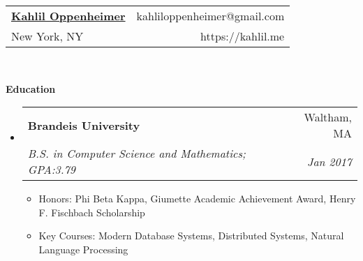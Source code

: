 \documentclass[letterpaper,11pt]{article}
\makeatletter
\newcommand{\resitem}[1]{\item #1 \vspace{-2pt}}
\newcommand{\resheading}[1]{{\large \colorbox{mygrey}{\begin{minipage}{\textwidth}{\textbf{#1 \vphantom{p\^{E}}}}\end{minipage}}}}
\newcommand{\ressubheading}[4]{
\begin{tabular*}{6.5in}{l@{\extracolsep{\fill}}r}
		\textbf{#1} & #2 \\
		\textit{#3} & \textit{#4} \\
\end{tabular*}\vspace{-6pt}}
\makeatother
\begin{document}
\newcommand{\mywebheader}{
	\begin{tabular*}{7in}{l@{\extracolsep{\fill}}r}
		\textbf{\LARGE \href{https://kahlil.me}{Kahlil Oppenheimer}} & {kahliloppenheimer@gmail.com} \\
		New York, NY & https://kahlil.me
	\end{tabular*}
	\\
	\vspace{0.1in}}

\mywebheader

\resheading{Education}
\begin{itemize}
	\item
	      \ressubheading{Brandeis University}{Waltham, MA}{B.S. in Computer Science and Mathematics; GPA:3.79}{Jan 2017}
	      { \footnotesize
	      	\begin{itemize}
	      		\resitem{Honors: Phi Beta Kappa, Giumette Academic Achievement Award, Henry F. Fischbach Scholarship}
	      		\resitem{Key Courses: Modern Database Systems, Distributed Systems, Natural Language Processing}
	      	\end{itemize}
	      }
\end{itemize} %
\end{document}
